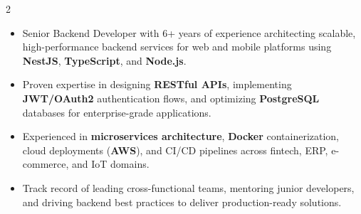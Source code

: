 \documentclass[10pt,a4paper,ragged2e,withhyper]{altacv}
\begin{document}


    \makecvheader


    \begin{paracol}{2}



        \newpage

        \switchcolumn

\begin{itemize}
    \item Senior Backend Developer with 6+ years of experience architecting scalable, high-performance backend services for web and mobile platforms using \textbf{NestJS}, \textbf{TypeScript}, and \textbf{Node.js}.
    \item Proven expertise in designing \textbf{RESTful APIs}, implementing \textbf{JWT/OAuth2} authentication flows, and optimizing \textbf{PostgreSQL} databases for enterprise-grade applications.
    \item Experienced in \textbf{microservices architecture}, \textbf{Docker} containerization, cloud deployments (\textbf{AWS}), and CI/CD pipelines across fintech, ERP, e-commerce, and IoT domains.
    \item Track record of leading cross-functional teams, mentoring junior developers, and driving backend best practices to deliver production-ready solutions.
\divider
\end{itemize}


\end{paracol}
\end{document}
